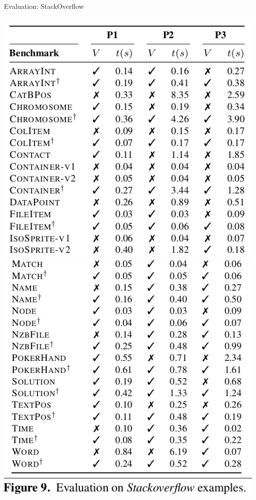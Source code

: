 \documentclass[page number]{beamer}
\begin{document}
\begin{frame}{Evaluation: StackOverflow}
    \begin{center}
    \includegraphics[scale=0.3]{img_sousa/91.png}
    \includegraphics[scale=0.3]{img_sousa/92.png}
  \end{center}
\end{frame}
\end{document}
